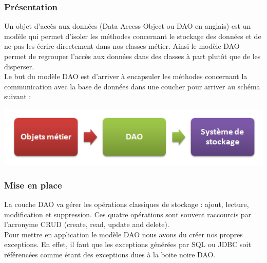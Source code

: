 \subsubsection{Présentation}
Un objet d'accès aux données (Data Access Object ou DAO en anglais) est un modèle qui permet d'isoler les méthodes concernant le stockage des données et de ne pas les écrire directement dans nos classes métier. Ainsi le modèle DAO permet de regrouper l'accès aux données dans des classes à part plutôt que de les disperser. \\

Le but du modèle DAO est d'arriver à encapsuler les méthodes concernant la communication avec la base de données dans une coucher pour arriver au schéma suivant :

\begin{center}
\includegraphics[scale=0.5]{../graph/dao1.png} \\
\end{center}

\subsubsection{Mise en place}
La couche DAO va gérer les opérations classiques de stockage : ajout, lecture, modification et suppression. Ces quatre opérations sont souvent raccourcis par l'acronyme CRUD (create, read, update and delete). \\

Pour mettre en application le modèle DAO nous avons du créer nos propres exceptions. En effet, il faut que les exceptions générées par SQL ou JDBC soit référencées comme étant des exceptions dues à la boite noire DAO. 

